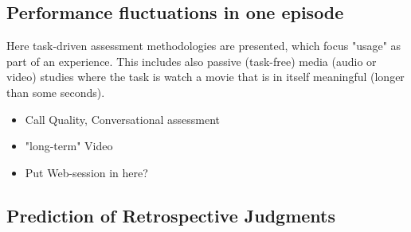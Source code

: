 \subsection{Performance fluctuations in one episode}
Here task-driven assessment methodologies are presented, which focus "usage" as part of an experience.
This includes also passive (task-free) media (audio or video) studies where the task is watch a movie that is in itself meaningful (longer than some seconds).

\begin{itemize}
\item Call Quality, Conversational assessment
\item "long-term" Video
\item Put Web-session in here?
\end{itemize}


\subsection{Prediction of Retrospective Judgments}
